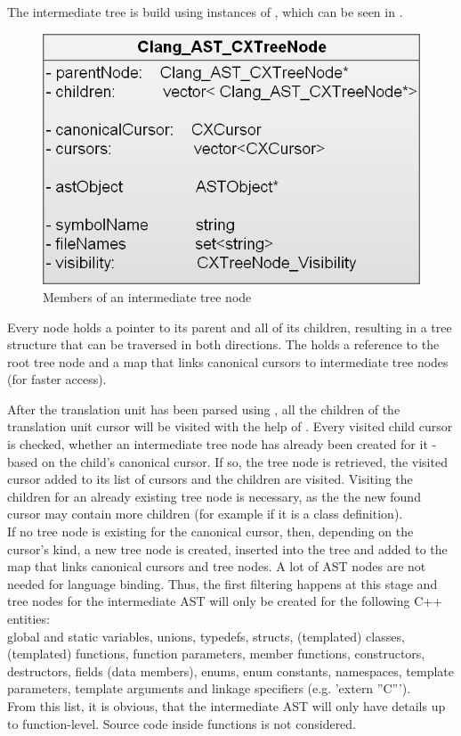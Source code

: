 The intermediate tree is build using instances of , which can be seen in . 

\begin{figure}[h] %
	\centering
		\includegraphics[scale=0.3]{Images/CXTreeNode.png}
	\caption{Members of an intermediate tree node}
	\label{fig:CXTreeNode}
\end{figure}

Every node holds a pointer to its parent and all of its children, resulting in a tree structure that can be traversed in both directions. 
The  holds a reference to the root tree node and a map that links canonical cursors to intermediate tree nodes (for faster access).

After the translation unit has been parsed using , all the children of the translation unit cursor will be visited with the help of . Every visited child cursor is checked, whether an intermediate tree node has already been created for it - based on the child's canonical cursor. If so, the tree node is retrieved, the visited cursor added to its list of cursors and the children are visited. Visiting the children for an already existing tree node is necessary, as the the new found cursor may contain more children (for example if it is a class definition).\\
If no tree node is existing for the canonical cursor, then, depending on the cursor's kind, a new tree node is created, inserted into the tree and added to the map that links canonical cursors and tree nodes. A lot of AST nodes are not needed for language binding. Thus, the first filtering happens at this stage and tree nodes for the intermediate AST will only be created for the following C++ entities:\\global and static variables, unions, typedefs, structs, (templated) classes, (templated) functions, function parameters, member functions, constructors, destructors, fields (data members), enums, enum constants, namespaces, template parameters, template arguments and linkage specifiers (e.g. 'extern ''C''').\\
From this list, it is obvious, that the intermediate AST will only have details up to function-level. Source code inside functions is not considered. 

